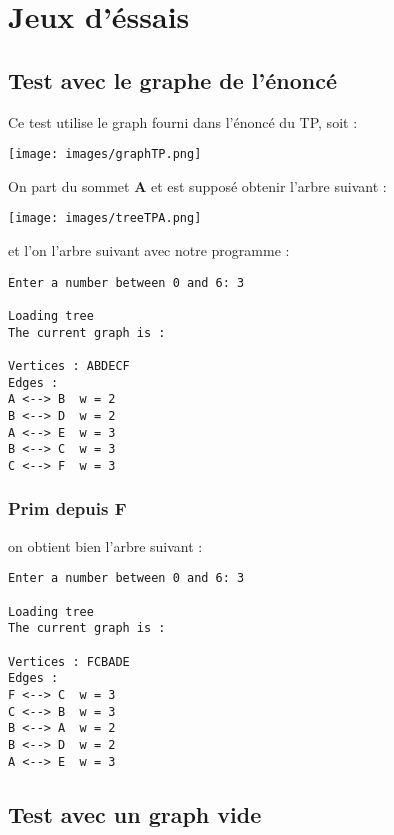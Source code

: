 \documentclass[12pt, a4paper,twoside]{article}
\begin{document}
    \section{Jeux d'éssais}

    \subsection{Test avec le graphe de l'énoncé}

    Ce test utilise le graph fourni dans l'énoncé du TP, soit :


    \begin{center}
        \texttt{[image: images/graphTP.png]}
    \end{center}

    On part du sommet \textbf{A} et est supposé obtenir l'arbre suivant :

    \begin{center}
        \texttt{[image: images/treeTPA.png]}
    \end{center}

    et l'on l'arbre suivant avec notre programme :

    \begin{lstlisting}
Enter a number between 0 and 6: 3

Loading tree
The current graph is :

Vertices : ABDECF
Edges :
A <--> B  w = 2
B <--> D  w = 2
A <--> E  w = 3
B <--> C  w = 3
C <--> F  w = 3
    \end{lstlisting}
    \subsubsection{Prim depuis F}

    on obtient bien l'arbre suivant :

    \begin{lstlisting}
Enter a number between 0 and 6: 3

Loading tree
The current graph is :

Vertices : FCBADE
Edges :
F <--> C  w = 3
C <--> B  w = 3
B <--> A  w = 2
B <--> D  w = 2
A <--> E  w = 3
    \end{lstlisting}
    \subsection{Test avec un graph vide}
\end{document}
